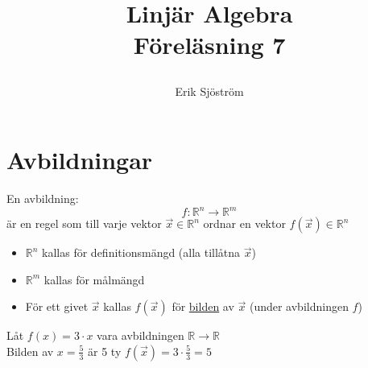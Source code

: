 
\title{
	 Linjär Algebra\\
	 Föreläsning 7
    \author{Erik Sjöström}
}

\maketitle

\section{Avbildningar} %
\label{sec:avbildningnar}
En avbildning:
\[
f: \mathbb{R}^n \rightarrow \mathbb{R}^m
\]
är en regel som till varje vektor $\vec{x} \in \mathbb{R}^n$ ordnar en vektor $f(\vec{x}) \in \mathbb{R}^n$ 
\begin{itemize}
	\item $\mathbb{R}^n$ kallas för definitionsmängd (alla tillåtna $\vec{x}$)
	\item $\mathbb{R}^m$ kallas för målmängd
	\item För ett givet $\vec{x}$ kallas $f(\vec{x})$ för \underline{bilden} av $\vec{x}$ (under avbildningen $f$)
\end{itemize}
\begin{Ex}
    Låt $f(x) = 3 \cdot x$ vara avbildningen $\mathbb{R} \rightarrow \mathbb{R}$\\
    Bilden av $x = \frac{5}{3}$ är 5 ty $f(\vec{x}) = 3 \cdot \frac{5}{3} = 5$
\end{Ex}
